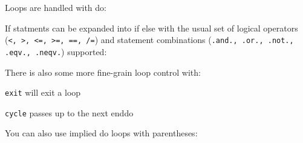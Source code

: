 Loops are handled with do:
\begin{quote}

\end{quote}

If statments can be expanded into if else with the usual set of logical operators
 (\texttt{<, >, <=, >=, ==, /=}) and statement combinations
 (\texttt{.and., .or., .not., .eqv., .neqv.}) supported:
\begin{quote}

\end{quote}

\noindent There is also some more fine-grain loop control with:

\texttt{exit} will exit a loop

\texttt{cycle} passes up to the next enddo
\begin{quote}

\end{quote}

\noindent You can also use implied do loops with parentheses:
\begin{quote}

\end{quote}
